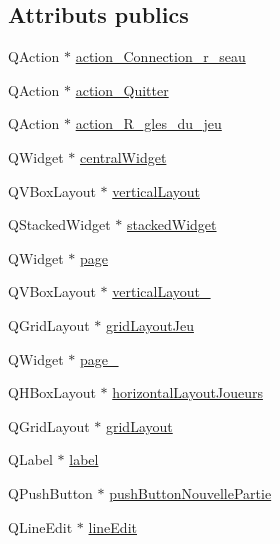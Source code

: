 \subsection*{Attributs publics}
\begin{DoxyCompactItemize}
\item 
Q\-Action $\ast$ \hyperlink{class_ui___main_window_a6c80311f3167ec9431b5c86203dda5c5}{action\-\_\-\-Connection\-\_\-r\-\_\-seau}
\item 
Q\-Action $\ast$ \hyperlink{class_ui___main_window_a16d39d241a02bfb61fab07149d15868f}{action\-\_\-\-Quitter}
\item 
Q\-Action $\ast$ \hyperlink{class_ui___main_window_abe63bbd9a48e3e688fefab2ef89605c0}{action\-\_\-\-R\-\_\-gles\-\_\-du\-\_\-jeu}
\item 
Q\-Widget $\ast$ \hyperlink{class_ui___main_window_a30075506c2116c3ed4ff25e07ae75f81}{central\-Widget}
\item 
Q\-V\-Box\-Layout $\ast$ \hyperlink{class_ui___main_window_aecd96a04789fcfec3f98d80390ad8184}{vertical\-Layout}
\item 
Q\-Stacked\-Widget $\ast$ \hyperlink{class_ui___main_window_a8d440a6df1de0bc57afcdda7476d8f19}{stacked\-Widget}
\item 
Q\-Widget $\ast$ \hyperlink{class_ui___main_window_ad7d164376bef8649ee1f94697b859417}{page}
\item 
Q\-V\-Box\-Layout $\ast$ \hyperlink{class_ui___main_window_a0c01bad60d9f422a1258e710635a2f65}{vertical\-Layout\-\_}
\item 
Q\-Grid\-Layout $\ast$ \hyperlink{class_ui___main_window_a3b659bbe89dcd06d32a7039a432ff110}{grid\-Layout\-Jeu}
\item 
Q\-Widget $\ast$ \hyperlink{class_ui___main_window_adcb6de4cebc6760fe319711f125010cc}{page\-\_}
\item 
Q\-H\-Box\-Layout $\ast$ \hyperlink{class_ui___main_window_a9a43633211d56018140b0d718e9fcc2e}{horizontal\-Layout\-Joueurs}
\item 
Q\-Grid\-Layout $\ast$ \hyperlink{class_ui___main_window_a525ed3c5fe0784ac502ee222fba4e205}{grid\-Layout}
\item 
Q\-Label $\ast$ \hyperlink{class_ui___main_window_ad9c89133780f28e6efa2ec17ceb9cff5}{label}
\item 
Q\-Push\-Button $\ast$ \hyperlink{class_ui___main_window_ad96a0a746b68d03e700e0bf4c899d389}{push\-Button\-Nouvelle\-Partie}
\item 
Q\-Line\-Edit $\ast$ \hyperlink{class_ui___main_window_a7a5b9a4633d64f502ce81da3202d828c}{line\-Edit}

\end{DoxyCompactItemize}
